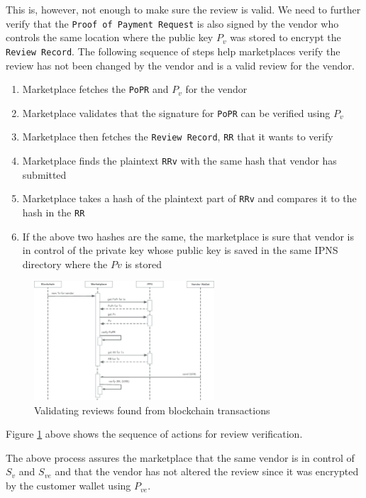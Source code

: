 \documentclass[a4paper]{article}
\begin{document}
This is, however, not enough to make sure the review is valid. We need
to further verify that the \texttt{Proof of Payment Request} is also
signed by the vendor who controls the same location where the public
key $P_v$ was stored to encrypt the \texttt{Review Record}. The
following sequence of steps help marketplaces verify the review has
not been changed by the vendor and is a valid review for the vendor.

\begin{enumerate}
\item Marketplace fetches the \texttt{PoPR} and $P_v$ for the vendor
\item Marketplace validates that the signature for \texttt{PoPR} can be
  verified using $P_v$
\item Marketplace then fetches the \texttt{Review Record}, \texttt{RR}
  that it wants to verify
\item Marketplace finds the plaintext \texttt{RRv} with the same hash that
  vendor has submitted
\item Marketplace takes a hash of the plaintext part of \texttt{RRv}
  and compares it to the hash in the \texttt{RR}
\item If the above two hashes are the same, the marketplace is sure
  that vendor is in control of the private key whose public key is
  saved in the same IPNS directory where the $Pv$ is stored
\end{enumerate}

\begin{figure}
\centering
\includegraphics[width=0.6\textwidth]{../validating-new-tx.eps}
\caption{\label{fig:validating-new-tx}Validating reviews found from blockchain transactions}
\end{figure}

Figure \ref{fig:validating-new-tx} above shows the sequence of actions
for review verification.

The above process assures the marketplace that the same vendor is in
control of $S_v$ and $S_{ve}$ and that the vendor has not altered the review
since it was encrypted by the customer wallet using $P_{ve}$.
\end{document}

